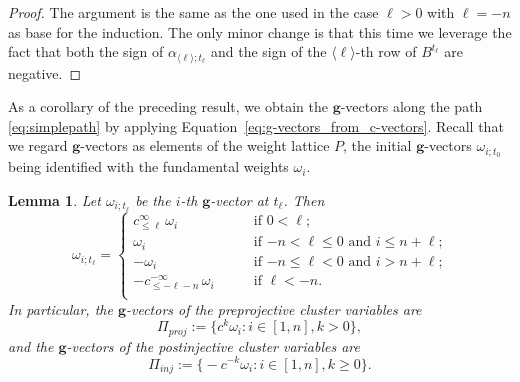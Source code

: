 \documentclass[12pt]{amsart}
\newcommand{\bfg}{\mathbf{g}}
\newcommand{\cv}{\alpha}
\newcommand{\gv}{\omega}
\renewcommand{\mod}[1]{\langle {#1} \rangle}
\newcommand{\Zidx}{\ell}
\newtheorem{lemma}[theorem]{Lemma}
\theoremstyle{remark}
\numberwithin{equation}{section}
\numberwithin{figure}{section}
\begin{document}
\begin{proof}
  \noindent{\bf Case $\Zidx < -n$.}
  The argument is the same as the one used in the case $\Zidx>0$ with $\Zidx=-n$ as base for the induction.
  The only minor change is that this time we leverage the fact that both the sign of $\cv_{\mod{\Zidx};t_\Zidx}$ and the sign of the $\mod{\Zidx}$-th row of $B^{t_\Zidx}$ are negative.
\end{proof}

As a corollary of the preceding result,  we obtain the $\bfg$-vectors along the path \eqref{eq:simplepath} by applying Equation~\eqref{eq:g-vectors_from_c-vectors}. Recall that we regard $\bfg$-vectors as elements of the weight lattice $P$, the initial $\bfg$-vectors $\gv_{i;t_0}$ being identified with the fundamental weights $\omega_i$.

\begin{lemma}
  \label{lemma:g-vectors}
  Let $\gv_{i;t_\Zidx}$ be the $i$-th $\bfg$-vector at $t_\Zidx$.
  Then
  \begin{equation}\label{eq:abeltgvectors}
    \gv_{i;t_\Zidx}
    =
    \begin{cases}
      c^\infty_{\le\Zidx}\, \omega_i & \text{if $0<\Zidx$;}\\
      \omega_i & \text{if $-n < \Zidx \leq 0$ and  $i\leq n+\Zidx$;} \\
      -\omega_i & \text{if $-n\leq \Zidx < 0$ and $i>n+\Zidx$;} \\
      -c^{-\infty}_{\le-\Zidx-n}\, \omega_i \qquad & \text{if $\Zidx <-n$.}\\
    \end{cases}
  \end{equation}
  In particular, the $\bfg$-vectors of the preprojective cluster variables are
  \[
    \Pi_{\textit{proj}}:=\big\{c^k\omega_i: i \in [1,n], k>0\big\},
  \]
  and the $\bfg$-vectors of the postinjective cluster variables are
  \[
  \Pi_{\textit{inj}}:=\big\{-c^{-k}\omega_i: i \in [1,n], k\geq0 \big\}.
  \]
\end{lemma}
\end{document}

